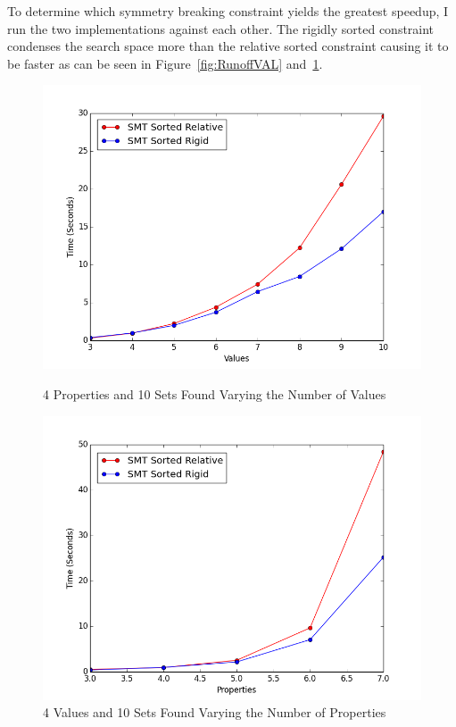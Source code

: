\documentclass[pageno]{jpaper}
\begin{document}




To determine which symmetry breaking constraint yields the greatest speedup, I run the two implementations against each other. The rigidly sorted constraint condenses the search space more than the relative sorted constraint causing it to be faster as can be seen in Figure~\ref{fig:RunoffVAL} and~\ref{fig:RunoffPROP}.  

\begin{figure}[htbb]
\begin{minipage}[b]{0.5\linewidth}
\centering
\includegraphics[width=.75\linewidth]{RunoffSMTVAL-v345678910p4n10.png}
\caption{4 Properties and 10 Sets Found Varying the Number of Values}
\label{fig:RunoffVAL}
\end{minipage}
\hspace{0.5cm}
\begin{minipage}[b]{0.5\linewidth}
\centering
\includegraphics[width=.75\linewidth]{RunoffSMTPROP-v4p34567n10.png}
\caption{4 Values and 10 Sets Found Varying the Number of Properties}
\label{fig:RunoffPROP}
\end{minipage}
\end{figure}
\end{document}
